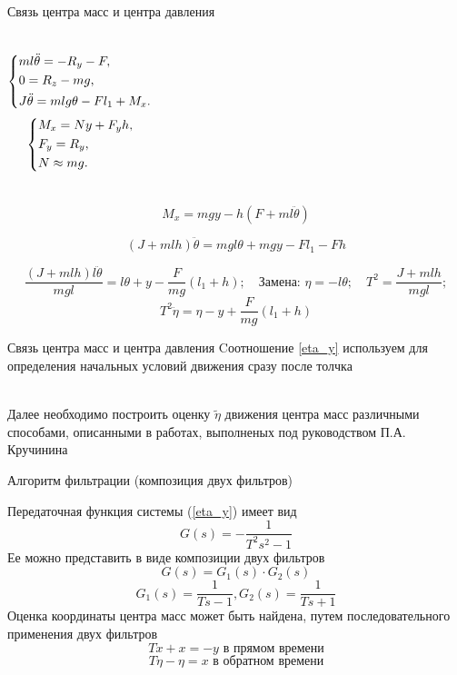 \documentclass[10pt]{beamer}
\begin{document}
\begin{frame}{Связь центра масс и центра давления}
	\begin{columns}
		\begin{equation}\label{init_cond_1}
			\left\{ {\begin{aligned}
						 & ml\ddot{\theta} = -R_y-F , \hfill             \\
						 & 0=R_z-mg, \hfill                              \\
						 & J \ddot{\theta} = mlg\theta-Fl_1+M_x . \hfill \\
					\end{aligned}} \right.
		\end{equation}
		\begin{equation}\label{init_cond_2}
			\left\{ {\begin{aligned}
						 & M_x = Ny+F_yh , \hfill \\
						 & F_y = R_y , \hfill     \\
						 & N \approx mg . \hfill  \\
					\end{aligned}} \right.
		\end{equation}
	\end{columns}

	$$M_x=mgy-h\left(F+ml\ddot{\theta}\right)$$

	$$\left(J+mlh\right)\ddot{\theta}=mgl\theta+mgy-Fl_1-Fh$$


	$$\frac{(J+mlh)l\ddot{\theta}}{mgl}=l\theta+y-\frac{F}{mg}(l_1+h);\quad \text{Замена: }\eta=-l\theta; \quad T^2=\frac{J+mlh}{mgl};$$
	\begin{equation}\label{eta_y}
		T^2\ddot{\eta}=\eta-y+\frac{F}{mg}(l_1+h)
	\end{equation}

\end{frame}

\begin{frame}{Связь центра масс и центра давления}
	Cоотношение \eqref{eta_y} используем для определения начальных условий движения сразу после толчка

	\hfill \\
	Далее необходимо построить оценку $\tilde\eta$ движения центра масс различными способами, описанными в работах, выполненых под руководством П.А. Кручинина
\end{frame}


\begin{frame}{Алгоритм фильтрации (композиция двух фильтров)}

	Передаточная функция системы (\ref*{eta_y}) имеет вид
	\[
		G(s)=-\frac{1}{T^2s^2-1}
	\]
	Ее можно представить в виде композиции двух фильтров
	\[
		G(s)=G_1(s)\cdot G_2(s)
	\]
	\[
		G_1(s)=\frac{1}{Ts-1}, G_2(s)=\frac{1}{Ts+1}
	\]
	Оценка координаты центра масс может быть найдена, путем последовательного применения двух фильтров
	\[
		T \dot{x}+x=-y \text{ в прямом времени}
	\]
	\[
		T \dot{\eta}-\eta=x \text{ в обратном времени}
	\]
\end{frame}
\end{document}
